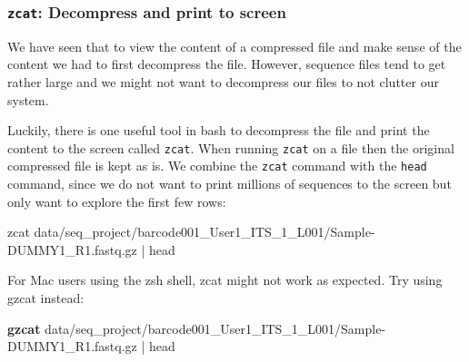 \documentclass[
  letterpaper,
  DIV=11,
  numbers=noendperiod]{scrreprt}
\newenvironment{Shaded}{}{}
\newcommand{\ExtensionTok}[1]{\textcolor[rgb]{0.84,0.23,0.29}{\textbf{#1}}}
\newcommand{\FunctionTok}[1]{\textcolor[rgb]{0.44,0.26,0.76}{#1}}
\newcommand{\KeywordTok}[1]{\textcolor[rgb]{0.84,0.23,0.29}{#1}}
\newcommand{\NormalTok}[1]{\textcolor[rgb]{0.14,0.16,0.18}{#1}}
\begin{document}
\subsubsection{\texorpdfstring{\texttt{zcat}: Decompress and print to
screen}{zcat: Decompress and print to screen}}\label{zcat-decompress-and-print-to-screen}

We have seen that to view the content of a compressed file and make
sense of the content we had to first decompress the file. However,
sequence files tend to get rather large and we might not want to
decompress our files to not clutter our system.

Luckily, there is one useful tool in bash to decompress the file and
print the content to the screen called \texttt{zcat}. When running
\texttt{zcat} on a file then the original compressed file is kept as is.
We combine the \texttt{zcat} command with the \texttt{head} command,
since we do not want to print millions of sequences to the screen but
only want to explore the first few rows:

\begin{Shaded}
\begin{Highlighting}[]
\FunctionTok{zcat}\NormalTok{ data/seq\_project/barcode001\_User1\_ITS\_1\_L001/Sample{-}DUMMY1\_R1.fastq.gz }\KeywordTok{|} \FunctionTok{head}
\end{Highlighting}
\end{Shaded}

\begin{tcolorbox}[enhanced jigsaw, breakable, left=2mm, title=\textcolor{quarto-callout-important-color}{\faExclamation}\hspace{0.5em}{Zcat for Mac users}, opacityback=0, opacitybacktitle=0.6, rightrule=.15mm, bottomrule=.15mm, colback=white, colframe=quarto-callout-important-color-frame, coltitle=black, bottomtitle=1mm, arc=.35mm, toprule=.15mm, colbacktitle=quarto-callout-important-color!10!white, toptitle=1mm, titlerule=0mm, leftrule=.75mm]

For Mac users using the zsh shell, zcat might not work as expected. Try
using gzcat instead:

\begin{Shaded}
\begin{Highlighting}[]
\ExtensionTok{gzcat}\NormalTok{ data/seq\_project/barcode001\_User1\_ITS\_1\_L001/Sample{-}DUMMY1\_R1.fastq.gz }\KeywordTok{|} \FunctionTok{head}
\end{Highlighting}
\end{Shaded}

\end{tcolorbox}
\end{document}

